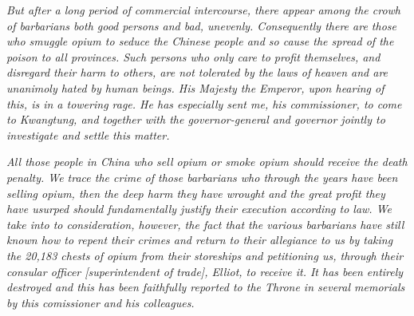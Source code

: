 \textrule
\vspace{0.6em}
\textit{But after a long period of commercial intercourse, there appear among the crowh of barbarians both good persons and bad, unevenly. Consequently there are those who smuggle opium to seduce the Chinese people and so cause the spread of the poison to all provinces. Such persons who only care to profit themselves, and disregard their harm to others, are not tolerated by the laws of heaven and are unanimoly hated by human beings. His Majesty the Emperor, upon hearing of this, is in a towering rage. He has especially sent me, his commissioner, to come to Kwangtung, and together with the governor-general and governor jointly to investigate and settle this matter.}

\textit{All those people in China who sell opium or smoke opium should receive the death penalty. We trace the crime of those barbarians who through the years have been selling opium, then the deep harm they have wrought and the great profit they have usurped should fundamentally justify their execution according to law. We take into to consideration, however, the fact that the various barbarians have still known how to repent their crimes and return to their allegiance to us by taking the 20,183 chests of opium from their storeships and petitioning us, through their consular officer [superintendent of trade], Elliot, to receive it. It has been entirely destroyed and this has been faithfully reported to the Throne in several memorials by this comissioner and his colleagues.}
\textrule \\
